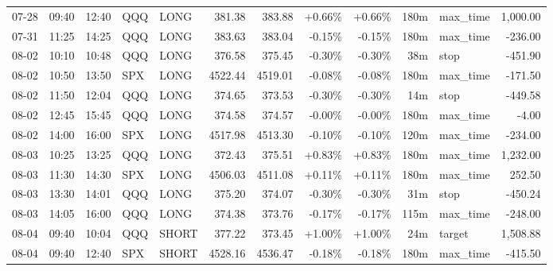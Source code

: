 \documentclass[11pt,a4paper,twoside]{article}
\begin{document}
\begin{center}
\begin{longtable}{>{\color{txtmain}}l l l l l r r r r r >{\color{txtmain}}l r}
07-28 & 09:40 & 12:40 & QQQ & LONG & 381.38 & 383.88 & \textcolor{wingreen}{+0.66\%} & \textcolor{wingreen}{+0.66\%} & 180m & max\_time & \textcolor{wingreen}{1,000.00} \\
07-31 & 11:25 & 14:25 & QQQ & LONG & 383.63 & 383.04 & \textcolor{lossred}{-0.15\%} & \textcolor{lossred}{-0.15\%} & 180m & max\_time & \textcolor{lossred}{-236.00} \\
08-02 & 10:10 & 10:48 & QQQ & LONG & 376.58 & 375.45 & \textcolor{lossred}{-0.30\%} & \textcolor{lossred}{-0.30\%} & 38m & stop & \textcolor{lossred}{-451.90} \\
08-02 & 10:50 & 13:50 & SPX & LONG & 4522.44 & 4519.01 & \textcolor{lossred}{-0.08\%} & \textcolor{lossred}{-0.08\%} & 180m & max\_time & \textcolor{lossred}{-171.50} \\
08-02 & 11:50 & 12:04 & QQQ & LONG & 374.65 & 373.53 & \textcolor{lossred}{-0.30\%} & \textcolor{lossred}{-0.30\%} & 14m & stop & \textcolor{lossred}{-449.58} \\
08-02 & 12:45 & 15:45 & QQQ & LONG & 374.58 & 374.57 & \textcolor{lossred}{-0.00\%} & \textcolor{lossred}{-0.00\%} & 180m & max\_time & \textcolor{lossred}{-4.00} \\
08-02 & 14:00 & 16:00 & SPX & LONG & 4517.98 & 4513.30 & \textcolor{lossred}{-0.10\%} & \textcolor{lossred}{-0.10\%} & 120m & max\_time & \textcolor{lossred}{-234.00} \\
08-03 & 10:25 & 13:25 & QQQ & LONG & 372.43 & 375.51 & \textcolor{wingreen}{+0.83\%} & \textcolor{wingreen}{+0.83\%} & 180m & max\_time & \textcolor{wingreen}{1,232.00} \\
08-03 & 11:30 & 14:30 & SPX & LONG & 4506.03 & 4511.08 & \textcolor{wingreen}{+0.11\%} & \textcolor{wingreen}{+0.11\%} & 180m & max\_time & \textcolor{wingreen}{252.50} \\
08-03 & 13:30 & 14:01 & QQQ & LONG & 375.20 & 374.07 & \textcolor{lossred}{-0.30\%} & \textcolor{lossred}{-0.30\%} & 31m & stop & \textcolor{lossred}{-450.24} \\
08-03 & 14:05 & 16:00 & QQQ & LONG & 374.38 & 373.76 & \textcolor{lossred}{-0.17\%} & \textcolor{lossred}{-0.17\%} & 115m & max\_time & \textcolor{lossred}{-248.00} \\
08-04 & 09:40 & 10:04 & QQQ & SHORT & 377.22 & 373.45 & \textcolor{wingreen}{+1.00\%} & \textcolor{wingreen}{+1.00\%} & 24m & target & \textcolor{wingreen}{1,508.88} \\
08-04 & 09:40 & 12:40 & SPX & SHORT & 4528.16 & 4536.47 & \textcolor{lossred}{-0.18\%} & \textcolor{lossred}{-0.18\%} & 180m & max\_time & \textcolor{lossred}{-415.50} \\

\end{longtable}
\end{center}
\end{document}
